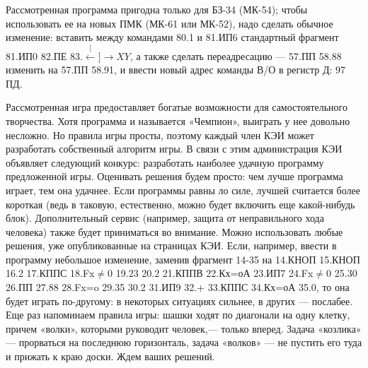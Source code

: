 \documentclass[11pt,a4paper,oneside]{article}
\def\XY{$\stackrel[\leftarrow]{\rightarrow}{XY}$}
\begin{document}
Рассмотренная программа пригодна только для БЗ-34 (МК-54); чтобы использовать ее на новых ПМК (МК-61 или МК-52), надо сделать обычное изменение: вставить между командами 80.1 и 81.ИП6 стандартный фрагмент 81.ИП0 82.ПЕ 83.\XY, а также сделать переадресацию — 57.ПП 58.88 изменить на 57.ПП 58.91, и ввести новый адрес команды В/О в регистр Д: 97 ПД.

Рассмотренная игра предоставляет богатые возможности для самостоятельного творчества. Хотя программа и называется «Чемпион», выиграть у нее довольно несложно. Но правила игры просты, поэтому каждый член КЭИ может разработать собственный алгоритм игры. В связи с этим администрация КЭИ объявляет следующий конкурс: разработать наиболее удачную программу предложенной игры. Оценивать решения будем просто: чем лучше программа играет, тем она удачнее. Если программы равны ло силе, лучшей считается более короткая (ведь в таковую, естественно, можно будет включить еще какой-нибудь блок). Дополнительный сервис (например, защита от неправильного хода человека) также будет приниматься во внимание. Можно использовать любые решения, уже опубликованные на страницах КЭИ. Если, например, ввести в программу небольшое изменение, заменив фрагмент 14-35 на 14.КНОП 15.КНОП 16.2 17.КППС 18.Fx$\neq$0 19.23 20.2 21.КППВ 22.Кх=оА 23.ИП7 24.Fx$\neq$0 25.30 26.ПП 27.88 28.Fx=o 29.35 30.2 31.ИП9 32.+ 33.КППС 34.Кх=оА 35.0, то она будет играть по-другому: в некоторых ситуациях сильнее, в других — послабее. Еще раз напоминаем правила игры: шашки ходят по диагонали на одну клетку, причем «волки», которыми руководит человек,— только вперед. Задача «козлика» — прорваться на последнюю горизонталь, задача «волков» — не пустить его туда и прижать к краю доски. Ждем ваших решений.
\end{document}
